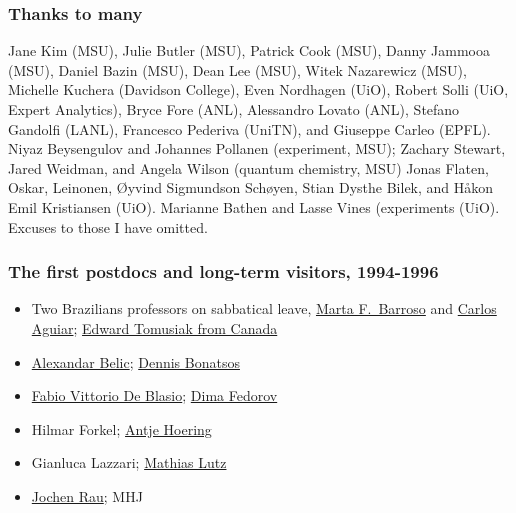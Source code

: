 \documentclass{beamer}
\begin{document}
\begin{frame}
\frametitle{Thanks to many}

Jane Kim (MSU), Julie Butler (MSU), Patrick Cook (MSU), Danny Jammooa (MSU), Daniel Bazin (MSU), Dean Lee (MSU), Witek Nazarewicz (MSU), Michelle Kuchera (Davidson College), Even Nordhagen (UiO), Robert Solli (UiO, Expert Analytics), Bryce Fore (ANL), Alessandro Lovato (ANL), Stefano Gandolfi (LANL), Francesco Pederiva (UniTN), and Giuseppe Carleo (EPFL). 
Niyaz Beysengulov and Johannes Pollanen (experiment, MSU); Zachary Stewart, Jared Weidman, and Angela Wilson (quantum chemistry, MSU)
Jonas Flaten, Oskar, Leinonen, Øyvind Sigmundson Schøyen, Stian Dysthe Bilek, and Håkon Emil Kristiansen (UiO). Marianne Bathen and Lasse Vines (experiments (UiO). Excuses to those I have omitted.
\end{frame}

\begin{frame}
\frametitle{The first postdocs and long-term visitors, 1994-1996}

\begin{itemize}
\item Two Brazilians professors on sabbatical leave, \href{{https://www.if.ufrj.br/en/docentes/marta-feijo-barroso/}}{Marta F.~Barroso} and \href{{https://www.if.ufrj.br/~carlos/carlos.html}}{Carlos Aguiar}; \href{{https://artsandscience.usask.ca/profile/ETomusiak}}{Edward Tomusiak from Canada}

\item \href{{http://www.scl.rs/scl-members/members/28-scl-members/members/413-aleksandar-belic-cv}}{Alexandar Belic}; \href{{http://www.inp.demokritos.gr/staff-members/dennis-bonatsos/}}{Dennis Bonatsos}

\item \href{{https://en.unimib.it/fabio-vittorio-de-blasio}}{Fabio Vittorio De Blasio}; \href{{https://pure.au.dk/portal/en/persons/dmitri-fedorov(9a03b124-d457-419c-b2e6-ca4e686b3b96).html}}{Dima Fedorov}

\item Hilmar Forkel; \href{{https://www.crab.org/research-statisticians.html}}{Antje Hoering}

\item Gianluca Lazzari; \href{{https://www.physik.tu-darmstadt.de/der_fachbereich/lehrende_physik/professor_innen_details_26176.en.jsp}}{Mathias Lutz}

\item \href{{https://www.q-info.org/about-me/}}{Jochen Rau}; MHJ
\end{itemize}

\noindent
\end{frame}
\end{document}
